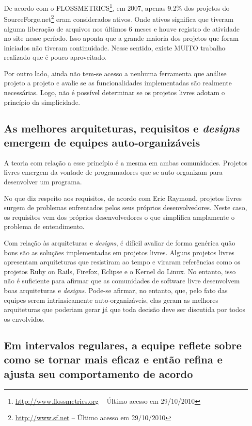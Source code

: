 De acordo com o
FLOSSMETRICS\footnote{\url{http://www.flossmetrics.org} -- Último
  acesso em 29/10/2010}, em 2007, apenas 9.2\% dos projetos do
SourceForge.net\footnote{\url{http://www.sf.net} -- Último acesso em
    29/10/2010} eram considerados ativos. Onde ativos significa que
tiveram alguma liberação de arquivos nos últimos 6 meses e houve
registro de atividade no site nesse período. Isso aponta que a grande
maioria dos projetos que foram iniciados não tiveram
continuidade. Nesse sentido, existe MUITO trabalho realizado que é
pouco aproveitado.

Por outro lado, ainda não tem-se acesso a nenhuma ferramenta que
análise projeto a projeto e avalie se as funcionalidades
implementadas são realmente necessárias. Logo, não é possível
determinar se os projetos livres adotam o princípio da simplicidade.

\subsection[Equipes auto-organizáveis]{As melhores arquiteturas,
  requisitos e \textit{designs} emergem de equipes auto-organizáveis}

A teoria com relação a esse princípio é a mesma em ambas
comunidades. Projetos livres emergem da vontade de programadores que
se auto-organizam para desenvolver um programa.

No que diz respeito aos requisitos, de acordo com Eric Raymond,
projetos livres surgem de problemas enfrentados pelos seus próprios
desenvolvedores. Neste caso, os requisitos vem dos próprios
desenvolvedores o que simplifica amplamente o problema de
entendimento.

Com relação às arquiteturas e \textit{designs}, é difícil avaliar de
forma genérica quão bons são as soluções implementadas em projetos
livres. Alguns projetos livres apresentam arquiteturas que resistiram
ao tempo e viraram referências como os projetos Ruby on Rails,
Firefox, Eclipse e o Kernel do Linux. No entanto, isso não é
suficiente para afirmar que as comunidades de software livre
desenvolvem boas arquiteturas e \textit{designs}. Pode-se afirmar, no
entanto, que, pelo fato das equipes serem intrinsicamente
auto-organizáveis, elas geram as melhores arquiteturas que poderiam
gerar já que toda decisão deve ser discutida por todos os envolvidos.

\subsection[Refletir regularmente]{Em intervalos regulares, a equipe
  reflete sobre como se tornar mais eficaz e então refina e ajusta seu
  comportamento de acordo}


